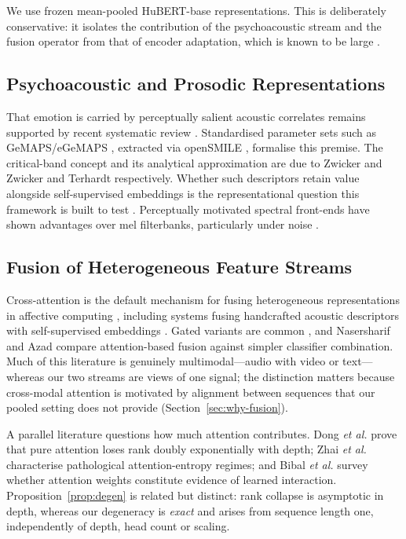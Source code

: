 \documentclass[journal,onecolumn,11pt,draftclsnofoot]{IEEEtran}   %
\begin{document}
We use frozen mean-pooled HuBERT-base representations. This is deliberately
conservative: it isolates the contribution of the psychoacoustic stream and the
fusion operator from that of encoder adaptation, which is known to be large
\cite{chen2023exploring}.

\subsection{Psychoacoustic and Prosodic Representations}
That emotion is carried by perceptually salient acoustic correlates remains
supported by recent systematic review \cite{schewski2025acoustic,
larrouymaestri2025prosody}. Standardised parameter sets such as GeMAPS/eGeMAPS
\cite{eyben2016gemaps}, extracted via openSMILE \cite{eyben2010opensmile},
formalise this premise. The critical-band concept and its analytical
approximation are due to Zwicker \cite{zwicker1961subdivision} and Zwicker and
Terhardt \cite{zwicker1980analytical} respectively. Whether such descriptors
retain value alongside self-supervised embeddings is the representational
question this framework is built to test \cite{dixit2024explaining}.
Perceptually motivated spectral front-ends have shown advantages over mel
filterbanks, particularly under noise \cite{peng2023cochleagram,
peng2023dimensional}.

\subsection{Fusion of Heterogeneous Feature Streams}
Cross-attention is the default mechanism for fusing heterogeneous
representations in affective computing \cite{vaswani2017attention,
praveen2021crossattention,zou2022coattention}, including systems fusing
handcrafted acoustic descriptors with self-supervised embeddings
\cite{zhao2025humpcat}. Gated variants are common \cite{li2025wavfusion}, and
Nasersharif and Azad \cite{nasersharif2024attention} compare attention-based
fusion against simpler classifier combination. Much of this literature is
genuinely multimodal---audio with video or text---whereas our two streams are
views of one signal; the distinction matters because cross-modal attention is
motivated by alignment between sequences that our pooled setting does not
provide (Section~\ref{sec:why-fusion}).

A parallel literature questions how much attention contributes. Dong \emph{et
al.} \cite{dong2021attentionnotall} prove that pure attention loses rank doubly
exponentially with depth; Zhai \emph{et al.} \cite{zhai2023entropycollapse}
characterise pathological attention-entropy regimes; and Bibal \emph{et al.}
\cite{bibal2022attention} survey whether attention weights constitute evidence
of learned interaction. Proposition~\ref{prop:degen} is related but distinct:
rank collapse is asymptotic in depth, whereas our degeneracy is \emph{exact} and
arises from sequence length one, independently of depth, head count or scaling.
\end{document}
